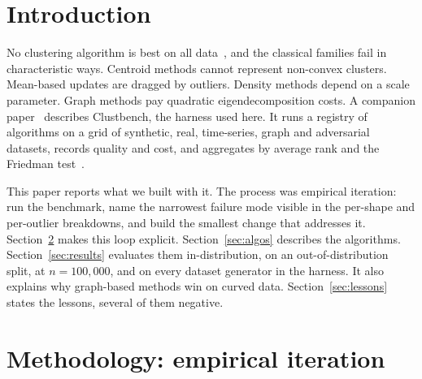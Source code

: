 \documentclass[11pt,a4paper]{article}
\begin{document}
\section{Introduction}
No clustering algorithm is best on all data~\cite{kleinberg2002impossibility,wolpert1997nfl},
and the classical families fail in characteristic ways. Centroid methods
cannot represent non-convex clusters. Mean-based updates are dragged by
outliers. Density methods depend on a scale parameter. Graph methods pay
quadratic eigendecomposition costs. A companion paper~\cite{clustbenchharness}
describes Clustbench, the harness used here. It runs a registry of algorithms
on a grid of synthetic, real, time-series, graph and adversarial datasets,
records quality and cost, and aggregates by average rank and the Friedman
test~\cite{demsar2006statistical}.

This paper reports what we built with it. The process was empirical
iteration: run the benchmark, name the narrowest failure mode visible in the
per-shape and per-outlier breakdowns, and build the smallest change that
addresses it. Section~\ref{sec:method} makes this loop explicit.
Section~\ref{sec:algos} describes the algorithms. Section~\ref{sec:results}
evaluates them in-distribution, on an out-of-distribution split, at
$n = 100{,}000$, and on every dataset generator in the harness. It also
explains why graph-based methods win on curved data.
Section~\ref{sec:lessons} states the lessons, several of them negative.

\section{Methodology: empirical iteration}\label{sec:method}
\end{document}
